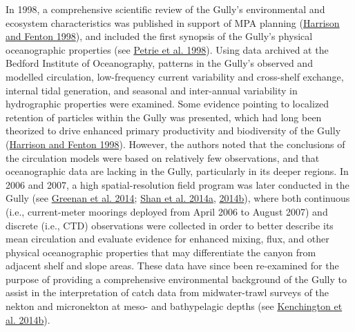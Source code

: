 \documentclass[12pt]{article}\usepackage[]{graphicx}\usepackage[]{color}
\begin{document}
In 1998, a comprehensive scientific review of the Gully's environmental and ecosystem characteristics was published in support of MPA planning (\protect\hyperlink{ref-harrison_1998}{Harrison and Fenton 1998}), and included the first synopsis of the Gully's physical oceanographic properties (see \protect\hyperlink{ref-petrie_1998}{Petrie et al. 1998}). Using data archived at the Bedford Institute of Oceanography, patterns in the Gully's observed and modelled circulation, low-frequency current variability and cross-shelf exchange, internal tidal generation, and seasonal and inter-annual variability in hydrographic properties were examined. Some evidence pointing to localized retention of particles within the Gully was presented, which had long been theorized to drive enhanced primary productivity and biodiversity of the Gully (\protect\hyperlink{ref-harrison_1998}{Harrison and Fenton 1998}). However, the authors noted that the conclusions of the circulation models were based on relatively few observations, and that oceanographic data are lacking in the Gully, particularly in its deeper regions. In 2006 and 2007, a high spatial-resolution field program was later conducted in the Gully (see \protect\hyperlink{ref-greenan_2014}{Greenan et al. 2014}; \protect\hyperlink{ref-shan_2014a}{Shan et al. 2014a}, \protect\hyperlink{ref-shan_2014b}{2014b}), where both continuous (i.e., current-meter moorings deployed from April 2006 to August 2007) and discrete (i.e., CTD) observations were collected in order to better describe its mean circulation and evaluate evidence for enhanced mixing, flux, and other physical oceanographic properties that may differentiate the canyon from adjacent shelf and slope areas. These data have since been re-examined for the purpose of providing a comprehensive environmental background of the Gully to assist in the interpretation of catch data from midwater-trawl surveys of the nekton and micronekton at meso- and bathypelagic depths (see \protect\hyperlink{ref-kenchington_2014b}{Kenchington et al. 2014b}).
\end{document}
